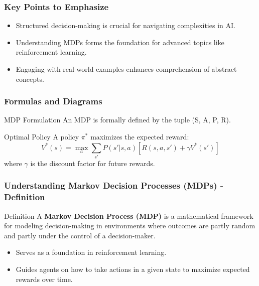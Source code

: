 \documentclass[aspectratio=169]{beamer}
\begin{document}
\begin{frame}[fragile]
    \frametitle{Key Points to Emphasize}
    \begin{itemize}
        \item Structured decision-making is crucial for navigating complexities in AI.
        \item Understanding MDPs forms the foundation for advanced topics like reinforcement learning.
        \item Engaging with real-world examples enhances comprehension of abstract concepts.
    \end{itemize}
\end{frame}

\begin{frame}[fragile]
    \frametitle{Formulas and Diagrams}
    \begin{block}{MDP Formulation}
        An MDP is formally defined by the tuple (S, A, P, R).
    \end{block}
    \begin{block}{Optimal Policy}
        A policy $\pi^*$ maximizes the expected reward:
        \begin{equation}
            V^*(s) = \max_a \sum_{s'} P(s'|s,a) [R(s,a,s') + \gamma V^*(s')]
        \end{equation}
        where $\gamma$ is the discount factor for future rewards.
    \end{block}
\end{frame}

\begin{frame}[fragile]
    \frametitle{Understanding Markov Decision Processes (MDPs) - Definition}
    \begin{block}{Definition}
        A \textbf{Markov Decision Process (MDP)} is a mathematical framework for modeling decision-making in environments where outcomes are partly random and partly under the control of a decision-maker.
        \begin{itemize}
            \item Serves as a foundation in reinforcement learning.
            \item Guides agents on how to take actions in a given state to maximize expected rewards over time.
        \end{itemize}
    \end{block}
\end{frame}
\end{document}
